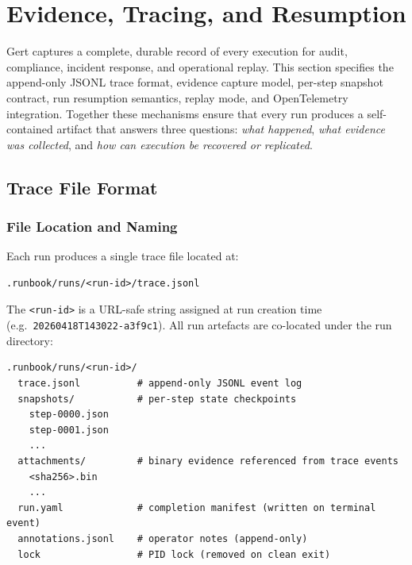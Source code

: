 \chapter{Evidence, Tracing, and Resumption}
\label{ch:evidence-tracing-resumption}
\label{ch:evidence}

Gert captures a complete, durable record of every execution for audit, compliance, incident response, and operational replay. This section specifies the append-only JSONL trace format, evidence capture model, per-step snapshot contract, run resumption semantics, replay mode, and OpenTelemetry integration. Together these mechanisms ensure that every run produces a self-contained artifact that answers three questions: \textit{what happened}, \textit{what evidence was collected}, and \textit{how can execution be recovered or replicated}.

\section{Trace File Format}
\label{sec:trace-file-format}

\subsection{File Location and Naming}

Each run produces a single trace file located at:

\begin{verbatim}
.runbook/runs/<run-id>/trace.jsonl
\end{verbatim}

The \texttt{<run-id>} is a URL-safe string assigned at run creation time (e.g.\ \texttt{20260418T143022-a3f9c1}). All run artefacts are co-located under the run directory:

\begin{verbatim}
.runbook/runs/<run-id>/
  trace.jsonl          # append-only JSONL event log
  snapshots/           # per-step state checkpoints
    step-0000.json
    step-0001.json
    ...
  attachments/         # binary evidence referenced from trace events
    <sha256>.bin
    ...
  run.yaml             # completion manifest (written on terminal event)
  annotations.jsonl    # operator notes (append-only)
  lock                 # PID lock (removed on clean exit)
\end{verbatim}

